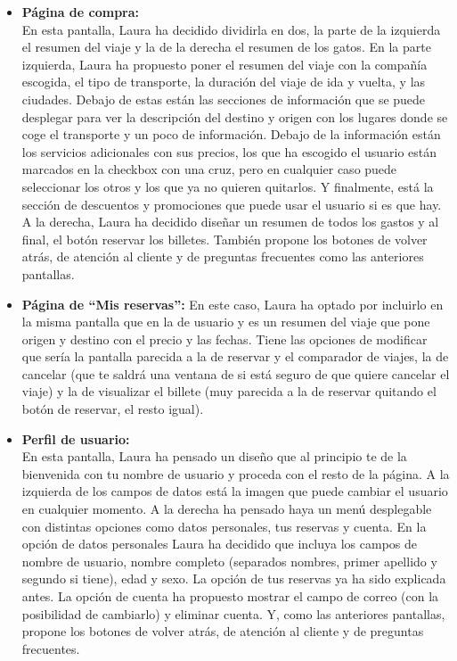\begin{itemize}
      \item\textbf{Página de compra:} \\ En esta pantalla, Laura ha decidido dividirla en dos, la parte de la izquierda el resumen del viaje y la de la derecha el resumen de los gatos.
            En la parte izquierda, Laura ha propuesto poner el resumen del viaje con la compañía escogida, el tipo de transporte, la duración del viaje de ida y vuelta, y las ciudades. Debajo de estas están las secciones de información que se puede desplegar para ver la descripción del destino y origen con los lugares donde se coge el transporte y un poco de información. Debajo de la información están los servicios adicionales con sus precios, los que ha escogido el usuario están marcados en la checkbox con una cruz, pero en cualquier caso puede seleccionar los otros y los que ya no quieren quitarlos. Y finalmente, está la sección de descuentos y promociones que puede usar el usuario si es que hay.
            A la derecha, Laura ha decidido diseñar un resumen de todos los gastos y al final, el botón reservar los billetes.
            También propone los botones de volver atrás, de atención al cliente y de preguntas frecuentes como las anteriores pantallas.
      \item\textbf{Página de ``Mis reservas'':} En este caso, Laura ha optado por incluirlo en la misma pantalla que en la de usuario y es un resumen del viaje que pone origen y destino con el precio y las fechas. Tiene las opciones de modificar que sería la pantalla parecida a la de reservar y el comparador de viajes, la de cancelar (que te saldrá una ventana de si está seguro de que quiere cancelar el viaje) y la de visualizar el billete (muy parecida a la de reservar quitando el botón de reservar, el resto igual).
      \item\textbf{Perfil de usuario:} \\ En esta pantalla, Laura ha pensado un diseño que al principio te de la bienvenida con tu nombre de usuario y proceda con el resto de la página.
            A la izquierda de los campos de datos está la imagen que puede cambiar el usuario en cualquier momento.
            A la derecha ha pensado haya un menú desplegable con distintas opciones como datos personales, tus reservas y cuenta.
            En la opción de datos personales Laura ha decidido que incluya los campos de nombre de usuario, nombre completo (separados nombres, primer apellido y segundo si tiene), edad y sexo.
            La opción de tus reservas ya ha sido explicada antes.
            La opción de cuenta ha propuesto mostrar el campo de correo (con la posibilidad de cambiarlo) y eliminar cuenta.
            Y, como las anteriores pantallas, propone los botones de volver atrás, de atención al cliente y de preguntas frecuentes.

\end{itemize}

